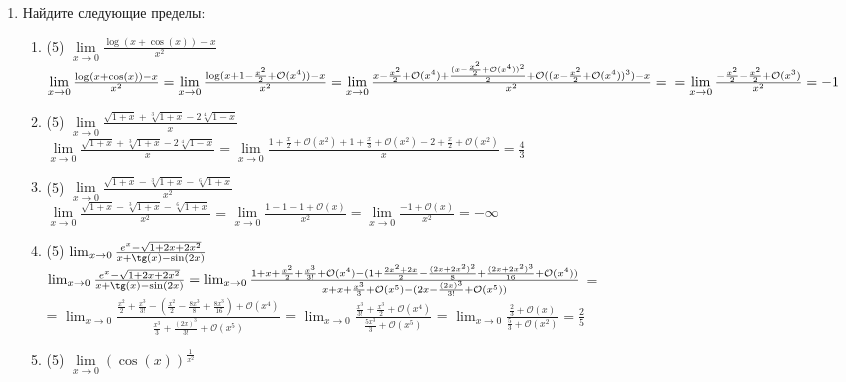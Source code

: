 \documentclass[a4paper]{article}
\begin{document}
\begin{enumerate}
    \item Найдите следующие пределы:
    \begin{enumerate}
        \item (5) $\lim\limits_{x\to 0}\frac{\log(x+\cos(x)) - x}{x^2}$\\
        $\lim\limits_{x\to 0}\frac{\log(x+\cos(x)) - x}{x^2} = \lim\limits_{x\to 0}\frac{\log(x + 1 - \frac{x^2}{2} + \mathcal O(x^4)) - x}{x^2} = 
        \lim\limits_{x\to 0}\frac{x - \frac{x^2}{2} + \mathcal O(x^4) + \frac{(x - \frac{x^2}{2} + \mathcal O(x^4))^2}{2} + \mathcal O((x - \frac{x^2}{2} + \mathcal O(x^4))^3) - x}{x^2} =\\= \lim\limits_{x\to 0}\frac{- \frac{x^2}{2} - \frac{x^2}{2} + \mathcal O(x^3)}{x^2} = -1$
        \item (5) $\lim\limits_{x\to 0}\frac{\sqrt{1+x} + \sqrt[3]{1+x} - 2\sqrt[4]{1-x}}{x}$\\
        $\lim\limits_{x\to 0}\frac{\sqrt{1+x} + \sqrt[3]{1+x} - 2\sqrt[4]{1-x}}{x} = \lim\limits_{x\to 0}\frac{1 + \frac{x}{2} + \mathcal O(x^2) + 1 + \frac{x}{3} + \mathcal O(x^2) - 2 + \frac{x}{2} + \mathcal O(x^2)}{x} = \frac{4}{3}$ 
        \item (5) $\lim\limits_{x\to 0}\frac{\sqrt{1+x} - \sqrt[3]{1+x} - \sqrt[6]{1+x}}{x^2}$\\
        $\lim\limits_{x\to 0}\frac{\sqrt{1+x} - \sqrt[3]{1+x} - \sqrt[6]{1+x}}{x^2}$ = $\lim\limits_{x\to 0}\frac{1 - 1 - 1 +\mathcal O(x)}{x^2} = \lim\limits_{x\to 0}\frac{-1 + \mathcal O(x)}{x^2} = -\infty$ 
        \item (5) $\lim_{x\to 0}\frac{e^x - \sqrt{1 + 2x + 2x^2}}{x + \tg(x) - \sin (2x)}$\\
        $\lim_{x\to 0}\frac{e^x - \sqrt{1 + 2x + 2x^2}}{x + \tg(x) - \sin (2x)} = \lim_{x\to 0}\frac{1 + x + \frac{x^2}{2} + \frac{x^3}{3!} + \mathcal O(x^4) - (1 + \frac{2x^2 + 2x}{2} - \frac{(2x + 2x^2)^2}{8} + \frac{(2x + 2x^2)^3}{16} + \mathcal O(x^4))}{x + x + \frac{x^3}{3} + \mathcal O(x^5) - (2x - \frac{(2x)^3}{3!} + \mathcal O(x^5))}$ =\\=
        $\lim_{x\to 0}\frac{\frac{x^2}{2} + \frac{x^3}{3!} - (\frac{x^2}{2} - \frac{8x^3}{8} + \frac{8x^3}{16}) + \mathcal O(x^4)}{\frac{x^3}{3} + \frac{(2x)^3}{3!} + \mathcal O(x^5)}$ = $\lim_{x\to 0}\frac{\frac{x^3}{3!} + \frac{x^3}{2} + \mathcal O(x^4)}{\frac{5x^3}{3} + \mathcal O(x^5)}$ = $\lim_{x\to 0}\frac{\frac{2}{3} + \mathcal O(x)}{\frac{5}{3} + \mathcal O(x^2)} = \frac{2}{5}$
        \item (5) $\lim\limits_{x\to 0}(\cos(x))^{\frac{1}{x^2}}$\\

\end{enumerate}
\end{enumerate}
\end{document}
